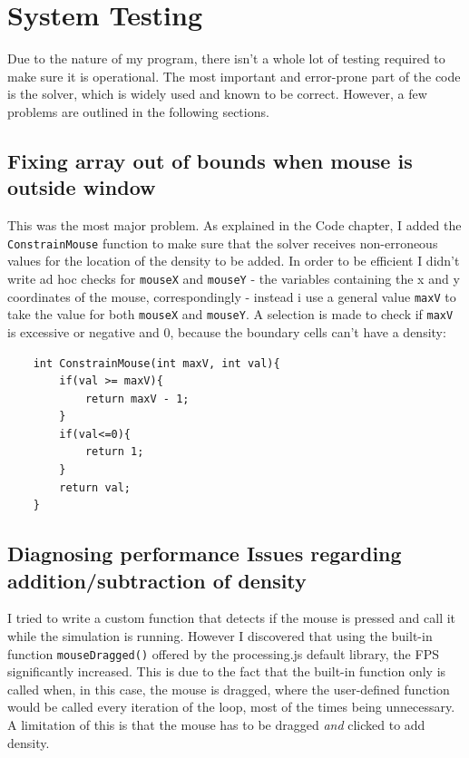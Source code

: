 \documentclass[12pt,a4paper]{book}
\begin{document}
\chapter{System Testing}
Due to the nature of my program, there isn't a whole lot of testing required to make sure it is operational. The most important and error-prone part of the code is the solver, which is widely used and known to be correct. However, a few problems are outlined in the following sections. 

\section{Fixing array out of bounds when mouse is outside window}
This was the most major problem. As explained in the Code chapter, I added the \verb|ConstrainMouse| function to make sure that the solver receives non-erroneous values for the location of the density to be added. In order to be efficient I didn't write ad hoc checks for \verb|mouseX| and \verb|mouseY| - the variables containing the x and y coordinates of the mouse, correspondingly - instead i use a general value \verb|maxV| to take the value for both \verb|mouseX| and \verb|mouseY|. A selection is made to check if \verb|maxV| is excessive or negative and 0, because the boundary cells can't have a density:\\
\begin{lstlisting}
	int ConstrainMouse(int maxV, int val){
		if(val >= maxV){
			return maxV - 1;
		}
		if(val<=0){
			return 1; 
		}
		return val;
	}
\end{lstlisting}

\section{Diagnosing performance Issues regarding addition/subtraction of density}
I tried to write a custom function that detects if the mouse is pressed and call it while the simulation is running. However I discovered that using the built-in function \verb|mouseDragged()| offered by the processing.js default library, the FPS significantly increased. This is due to the fact that the built-in function only is called when, in this case, the mouse is dragged, where the user-defined function would be called every iteration of the loop, most of the times being unnecessary. A limitation of this is that the mouse has to be dragged \emph{and} clicked to add density.\\
\end{document}
